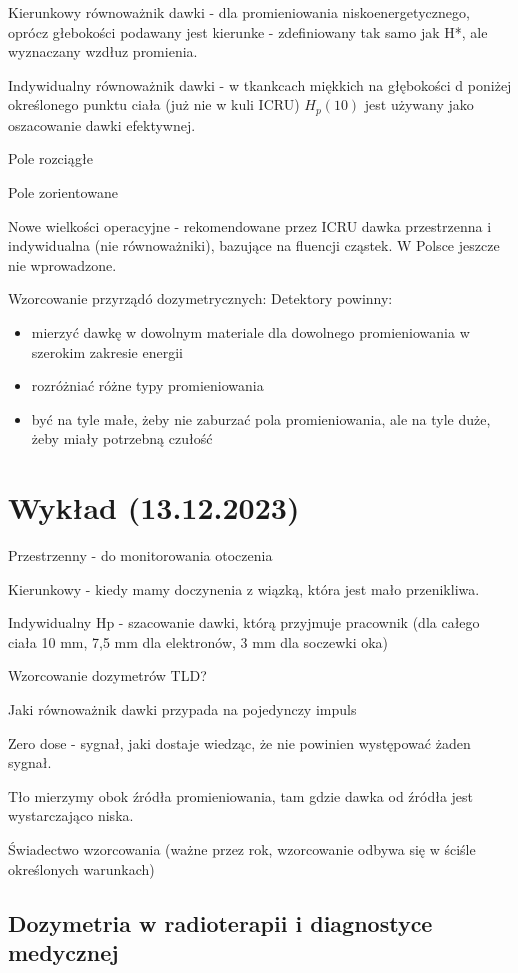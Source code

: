 \documentclass{article}
\begin{document}
Kierunkowy równoważnik dawki - dla promieniowania niskoenergetycznego, oprócz głebokości podawany jest kierunke - zdefiniowany tak samo jak H*, ale wyznaczany wzdłuz promienia.

Indywidualny równoważnik dawki - w tkankcach miękkich na głębokości d poniżej określonego punktu ciała (już nie w kuli ICRU) $H_p(10)$ jest używany jako oszacowanie dawki efektywnej.

Pole rozciągłe

Pole zorientowane

Nowe wielkości operacyjne - rekomendowane przez ICRU dawka przestrzenna i indywidualna (nie równoważniki), bazujące na fluencji cząstek. W Polsce jeszcze nie wprowadzone.

Wzorcowanie przyrządó dozymetrycznych:
Detektory powinny:
\begin{itemize}
    \item mierzyć dawkę w dowolnym materiale dla dowolnego promieniowania w szerokim zakresie energii
    \item rozróżniać różne typy promieniowania
    \item być na tyle małe, żeby nie zaburzać pola promieniowania, ale na tyle duże, żeby miały potrzebną czułość
\end{itemize}

\section{Wykład (13.12.2023)}

Przestrzenny - do monitorowania otoczenia

Kierunkowy - kiedy mamy doczynenia z wiązką, która jest mało przenikliwa.

Indywidualny Hp - szacowanie dawki, którą przyjmuje pracownik (dla całego ciała 10 mm, 7,5 mm dla elektronów, 3 mm dla soczewki oka)

Wzorcowanie dozymetrów TLD?

Jaki równoważnik dawki przypada na pojedynczy impuls

Zero dose - sygnał, jaki dostaje wiedząc, że nie powinien występować żaden sygnał.

Tło mierzymy obok źródła promieniowania, tam gdzie dawka od źródła jest wystarczająco niska.

Świadectwo wzorcowania (ważne przez rok, wzorcowanie odbywa się w ściśle określonych warunkach)

\subsection{Dozymetria w radioterapii i diagnostyce medycznej}
\end{document}
